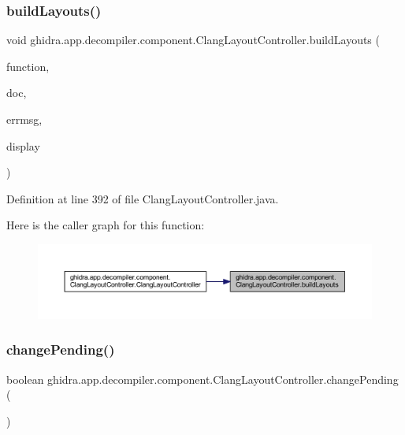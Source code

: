 \subsubsection{\texorpdfstring{buildLayouts()}{buildLayouts()}}
{\footnotesize\ttfamily void ghidra.\+app.\+decompiler.\+component.\+Clang\+Layout\+Controller.\+build\+Layouts (\begin{DoxyParamCaption}\item[{Function}]{function,  }\item[{\mbox{\hyperlink{classghidra_1_1app_1_1decompiler_1_1_clang_token_group}{Clang\+Token\+Group}}}]{doc,  }\item[{String}]{errmsg,  }\item[{boolean}]{display }\end{DoxyParamCaption})\hspace{0.3cm}{\ttfamily [inline]}}



Definition at line 392 of file Clang\+Layout\+Controller.\+java.

Here is the caller graph for this function\+:
\nopagebreak
\begin{figure}[H]
\begin{center}
\leavevmode
\includegraphics[width=350pt]{classghidra_1_1app_1_1decompiler_1_1component_1_1_clang_layout_controller_abb22911bb76c7e0b15800541130ce0c1_icgraph}
\end{center}
\end{figure}
\mbox{\label{classghidra_1_1app_1_1decompiler_1_1component_1_1_clang_layout_controller_a50c6c520d718f12994f5f8b4816805ce}} 
\subsubsection{\texorpdfstring{changePending()}{changePending()}}
{\footnotesize\ttfamily boolean ghidra.\+app.\+decompiler.\+component.\+Clang\+Layout\+Controller.\+change\+Pending (\begin{DoxyParamCaption}{ }\end{DoxyParamCaption})\hspace{0.3cm}{\ttfamily [inline]}}



